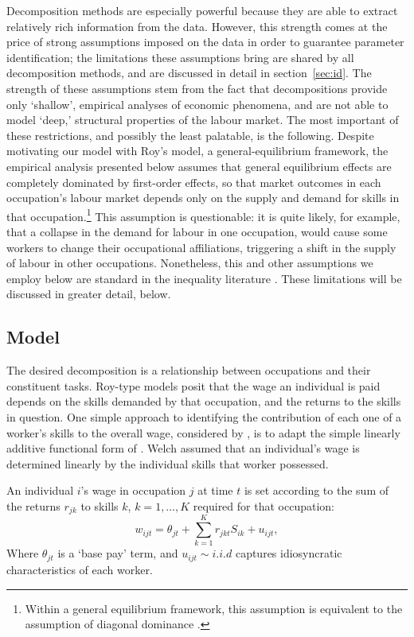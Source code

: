 Decomposition methods are especially powerful because they are able to extract relatively rich information from the data. However, this strength comes at the price of strong assumptions imposed on the data in order to guarantee parameter identification; the limitations these assumptions bring are shared by all decomposition methods, and are discussed in detail in section~\ref{sec:id}. The strength of these assumptions stem from the fact that decompositions provide only `shallow', empirical analyses of economic phenomena, and are not able to model `deep,' structural properties of the labour market. The most important of these restrictions, and possibly the least palatable, is the following. Despite motivating our model with Roy's model, a general-equilibrium framework, the empirical analysis presented below assumes that general equilibrium effects are completely dominated by first-order effects, so that market outcomes in each occupation's labour market depends only on the supply and demand for skills in that occupation.\footnote{Within a general equilibrium framework, this assumption is equivalent to the assumption of diagonal dominance \citep[p.233]{Arrow1971}.} This assumption is questionable: it is quite likely, for example, that a collapse in the demand for labour in one occupation, would cause some workers to change their occupational affiliations, triggering a shift in the supply of labour in other occupations. Nonetheless, this and other assumptions we employ below are standard in the inequality literature \citep[p.1]{Fortin2011}. These limitations will be discussed in greater detail, below.

\subsection{Model}

The desired decomposition is a relationship between occupations and their constituent tasks. Roy-type models posit that the wage an individual is paid depends on the skills demanded by that occupation, and the returns to the skills in question. One simple approach to identifying the contribution of each one of a worker's skills to the overall wage, considered by \citet{Firpo2011}, is to adapt the simple linearly additive functional form of \citet{Welch1969}. Welch assumed that an individual's wage is determined linearly by the individual skills that worker possessed.
\begin{assumption} \label{ass:linear}
  An individual $i$'s wage in occupation $j$ at time $t$ is set according to the sum of the returns $r_{jk}$ to skills $k$, $k=1,\dots,K$ required for that occupation:
\begin{equation}
  w_{ijt} = \theta_{jt} + \sum_{k=1}^K r_{jkt}S_{ik} + u_{ijt}, \label{eq:linear}
\end{equation}
Where $\theta_{jt}$ is a `base pay' term, and $u_{ijt}\sim i.i.d$ captures idiosyncratic characteristics of each worker. 
\end{assumption}

